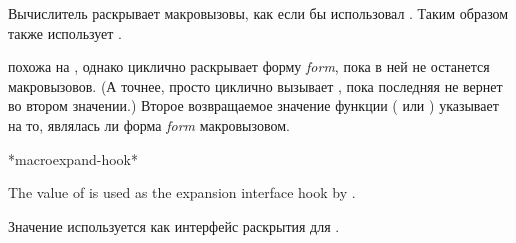 \begin{defun}[Function]
Вычислитель раскрывает макровызовы, как если бы использовал
. Таким образом  также использует
.

 похожа на , однако циклично раскрывает форму
\emph{form}, пока в ней не останется макровызовов.
(А точнее,  просто циклично вызывает , пока
последняя не вернет {\nil} во втором значении.)
Второе возвращаемое значение функции  ( или {\nil})
указывает на то, являлась ли форма \emph{form} макровызовом.

\end{defun}

\begin{defun}[Variable]
*macroexpand-hook*

The value of  is used as the expansion
interface hook by .

Значение  используется как интерфейс раскрытия для
.
\end{defun}

